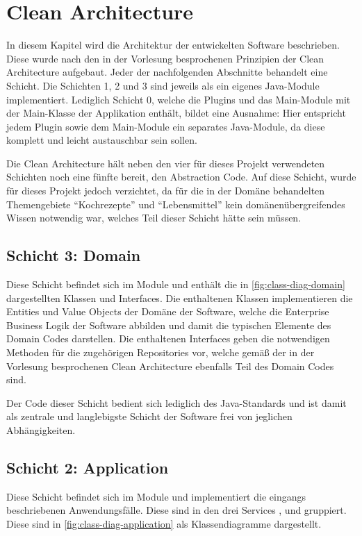 \chapter{Clean Architecture}
In diesem Kapitel wird die Architektur der entwickelten Software beschrieben. Diese wurde nach den in der Vorlesung besprochenen Prinzipien der Clean Architecture aufgebaut. Jeder der nachfolgenden Abschnitte behandelt eine Schicht. Die Schichten 1, 2 und 3 sind jeweils als ein eigenes Java-Module implementiert. Lediglich Schicht 0, welche die Plugins und das Main-Module mit der Main-Klasse der Applikation enthält, bildet eine Ausnahme: Hier entspricht jedem Plugin sowie dem Main-Module ein separates Java-Module, da diese komplett und leicht austauschbar sein sollen.

Die Clean Architecture hält neben den vier für dieses Projekt verwendeten Schichten noch eine fünfte bereit, den Abstraction Code. Auf diese Schicht, wurde für dieses Projekt jedoch verzichtet, da für die in der Domäne behandelten Themengebiete \enquote{Kochrezepte} und \enquote{Lebensmittel} kein domänenübergreifendes Wissen notwendig war, welches Teil dieser Schicht hätte sein müssen. 

\section{Schicht 3: Domain}
Diese Schicht befindet sich im Module \href{https://github.com/anditru/quickie/tree/bb41442c7f1ffbfcd3117cd86a40f7932e543a33/3-quickie-domain}{} und enthält die in \autoref{fig:class-diag-domain} dargestellten Klassen und Interfaces. Die enthaltenen Klassen implementieren die Entities und Value Objects der Domäne der Software, welche die Enterprise Business Logik der Software abbilden und damit die typischen Elemente des Domain Codes darstellen. Die enthaltenen Interfaces geben die notwendigen Methoden für die zugehörigen Repositories vor, welche gemäß der in der Vorlesung besprochenen Clean Architecture ebenfalls Teil des Domain Codes sind.

Der Code dieser Schicht bedient sich lediglich des Java-Standards und ist damit als zentrale und langlebigste Schicht der Software frei von jeglichen Abhängigkeiten.

\section{Schicht 2: Application}
Diese Schicht befindet sich im Module \href{https://github.com/anditru/quickie/tree/bb41442c7f1ffbfcd3117cd86a40f7932e543a33/2-quickie-application}{} und implementiert die eingangs beschriebenen Anwendungsfälle. Diese sind in den drei Services ,  und  gruppiert. Diese sind in \autoref{fig:class-diag-application} als Klassendiagramme dargestellt.

